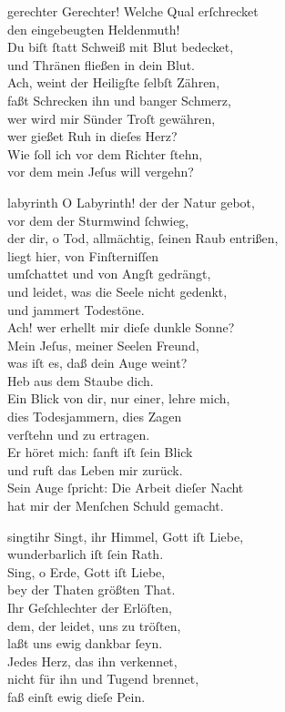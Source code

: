 \documentclass[shorttitlesize=55,tocstyle=ref-genre]{ees}
\begin{document}
{\begin{movement}{gerechter}
  \voice[Alto]
  Gerechter! Welche Qual erſchrecket\\
  den eingebeugten Heldenmuth!\\
  Du biſt ſtatt Schweiß mit Blut bedecket,\\
  und Thränen fließen in dein Blut.\\
  Ach, weint der Heiligſte ſelbſt Zähren,\\
  faßt Schrecken ihn und banger Schmerz,\\
  wer wird mir Sünder Troſt gewähren,\\
  wer gießet Ruh in dieſes Herz?\\
  Wie ſoll ich vor dem Richter ſtehn,\\
  vor dem mein Jeſus will vergehn?
\end{movement}

\begin{movement}{labyrinth}
  \voice[Basso]
  O Labyrinth! der der Natur gebot,\\
  vor dem der Sturmwind ſchwieg,\\
  der dir, o Tod, allmächtig, ſeinen Raub entrißen,\\
  liegt hier, von Finſterniſſen\\
  umſchattet und von Angſt gedrängt,\\
  und leidet, was die Seele nicht gedenkt,\\
  und jammert Todestöne.\\
  Ach! wer erhellt mir dieſe dunkle Sonne?\\
  Mein Jeſus, meiner Seelen Freund,\\
  was iſt es, daß dein Auge weint?\\
  Heb aus dem Staube dich.\\
  Ein Blick von dir, nur einer, lehre mich,\\
  dies Todesjammern, dies Zagen\\
  verſtehn und zu ertragen.\\
  Er höret mich: ſanft iſt ſein Blick\\
  und ruft das Leben mir zurück.\\
  Sein Auge ſpricht: Die Arbeit dieſer Nacht\\
  hat mir der Menſchen Schuld gemacht.
\end{movement}

\begin{movement}{singtihr}
  \voice[Coro]
  Singt, ihr Himmel, Gott iſt Liebe,\\
  wunderbarlich iſt ſein Rath.\\
  Sing, o Erde, Gott iſt Liebe,\\
  bey der Thaten größten That.\\
  Ihr Geſchlechter der Erlöſten,\\
  dem, der leidet, uns zu tröſten,\\
  laßt uns ewig dankbar ſeyn.\\
  Jedes Herz, das ihn verkennet,\\
  nicht für ihn und Tugend brennet,\\
  faß einſt ewig dieſe Pein.
\end{movement}

}
\end{document}
